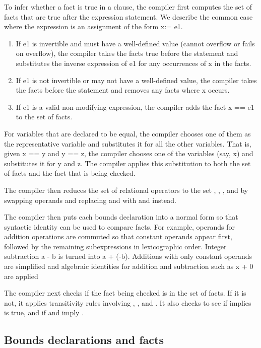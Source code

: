 To infer whether a fact is true in a  clause, the compiler first
computes the set of facts that are true after the expression statement.
We describe the common case where the expression is an assignment of the
form x:= e1.

\begin{enumerate}
\item
  If e1 is invertible and must have a well-defined value (cannot
  overflow or fails on overflow), the compiler takes the facts true
  before the statement and substitutes the inverse expression of e1 for
  any occurrences of x in the facts.
\item
  If e1 is not invertible or may not have a well-defined value, the
  compiler takes the facts before the statement and removes any facts
  where x occurs.
\item
  If e1 is a valid non-modifying expression, the compiler adds the fact
  x == e1 to the set of facts.
\end{enumerate}

For variables that are declared to be equal, the compiler chooses one of
them as the representative variable and substitutes it for all the other
variables. That is, given x == y and y == z, the compiler chooses one of
the variables (say, x) and substitutes it for y and z. The compiler
applies this substitution to both the set of facts and the fact that is
being checked.

The compiler then reduces the set of relational operators to the set
\code{<}, \code{<=}, \code{==}, and \code{!=}
by swapping operands and replacing \code{>} and \code{>=} 
with \code{<=} and \code{<} instead.

The compiler then puts each bounds declaration into a normal form so
that syntactic identity can be used to compare facts. For example,
operands for addition operations are commuted so that constant operands
appear first, followed by the remaining subexpressions in lexicographic
order. Integer subtraction a - b is turned into a + (-b). Additions
with only constant operands are simplified and algebraic identities for
addition and subtraction such as x + 0 are applied

The compiler next checks if the fact being checked is in the set of
facts. If it is not, it applies transitivity rules involving
\code{<}, \code{<=}, and \code{==}.
It also checks to see if \code{<}
implies \code{!=} is true, and if \code{<=} and
\code{>=} imply \code{==}.

\subsection{Bounds declarations and facts}

